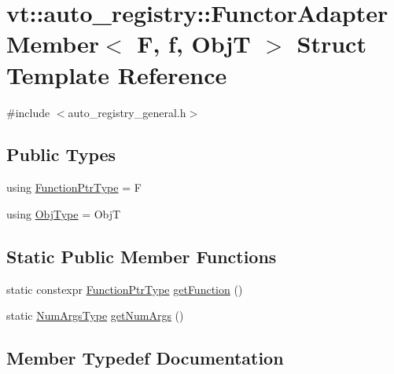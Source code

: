 \hypertarget{structvt_1_1auto__registry_1_1_functor_adapter_member}{}\section{vt\+:\+:auto\+\_\+registry\+:\+:Functor\+Adapter\+Member$<$ F, f, ObjT $>$ Struct Template Reference}
\label{structvt_1_1auto__registry_1_1_functor_adapter_member}


{\ttfamily \#include $<$auto\+\_\+registry\+\_\+general.\+h$>$}

\subsection*{Public Types}
\begin{DoxyCompactItemize}
\item 
using \hyperlink{structvt_1_1auto__registry_1_1_functor_adapter_member_a91cba3c1b53b4335861ba94ed69f212b}{Function\+Ptr\+Type} = F
\item 
using \hyperlink{structvt_1_1auto__registry_1_1_functor_adapter_member_a9bd2d75569c62fbdcf7539e50c9433ba}{Obj\+Type} = ObjT
\end{DoxyCompactItemize}
\subsection*{Static Public Member Functions}
\begin{DoxyCompactItemize}
\item 
static constexpr \hyperlink{structvt_1_1auto__registry_1_1_functor_adapter_member_a91cba3c1b53b4335861ba94ed69f212b}{Function\+Ptr\+Type} \hyperlink{structvt_1_1auto__registry_1_1_functor_adapter_member_a553928b633138999f824d2f67315af76}{get\+Function} ()
\item 
static \hyperlink{namespacevt_1_1auto__registry_aebda1d9d765bc9147dc654ad0712c936}{Num\+Args\+Type} \hyperlink{structvt_1_1auto__registry_1_1_functor_adapter_member_adf03543e17aaaf788a9631a9c5979c6a}{get\+Num\+Args} ()
\end{DoxyCompactItemize}


\subsection{Member Typedef Documentation}
\mbox{\label{structvt_1_1auto__registry_1_1_functor_adapter_member_a91cba3c1b53b4335861ba94ed69f212b}} 
